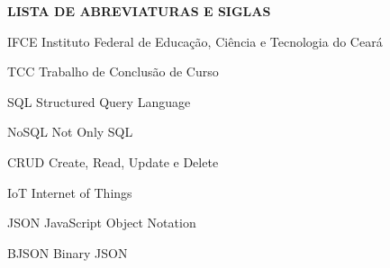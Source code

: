 \vfill
\begin{center}
{\textbf{LISTA DE ABREVIATURAS E SIGLAS}}
\end{center}
\vspace{0.5cm}

\begin{siglas}
\item[IFCE] Instituto Federal de Educação, Ciência e Tecnologia do Ceará
\item[TCC] Trabalho de Conclusão de Curso
\item[SQL] Structured Query Language
\item[NoSQL] Not Only SQL
\item[CRUD] Create, Read, Update e Delete
\item[IoT] Internet of Things
\item[JSON] JavaScript Object Notation
\item[BJSON] Binary JSON
\end{siglas}
